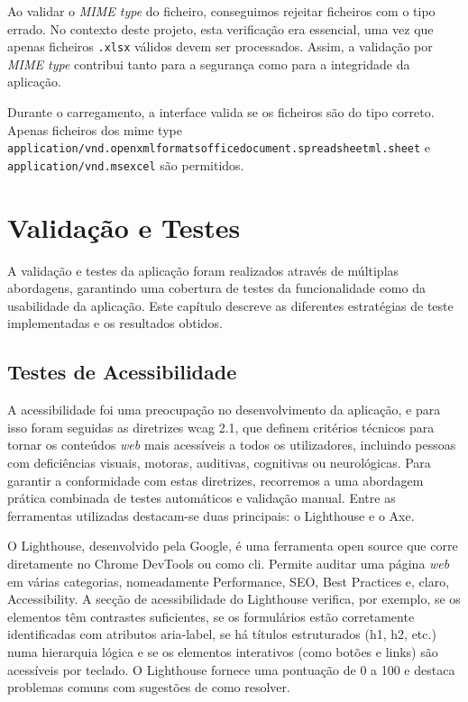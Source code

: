 Ao validar o \textit{MIME type} do ficheiro, conseguimos rejeitar ficheiros com o tipo errado. No contexto deste projeto, esta verificação era essencial, uma vez que apenas ficheiros \texttt{.xlsx} válidos devem ser processados. Assim, a validação por \textit{MIME type} contribui tanto para a segurança como para a integridade da aplicação.

Durante o carregamento, a interface valida se os ficheiros são do tipo correto. Apenas ficheiros dos mime type \texttt{application/vnd\allowbreak.openxmlformats\allowbreak officedocument\allowbreak.spreadsheetml\allowbreak.sheet} e \texttt{application/vnd.ms\allowbreak excel} são permitidos.

\chapter{Validação e Testes}
\label{ch:validacaoTestes}

A validação e testes da aplicação foram realizados através de múltiplas abordagens, garantindo uma cobertura de testes  da funcionalidade como da usabilidade da aplicação. Este capítulo descreve as diferentes estratégias de teste implementadas e os resultados obtidos.

\section{Testes de Acessibilidade}

A acessibilidade foi uma preocupação no desenvolvimento da aplicação, e para isso foram seguidas as diretrizes \gls{wcag} 2.1, que definem critérios técnicos para tornar os conteúdos \textit{web} mais acessíveis a todos os utilizadores, incluindo pessoas com deficiências visuais, motoras, auditivas, cognitivas ou neurológicas. Para garantir a conformidade com estas diretrizes, recorremos a uma abordagem prática combinada de testes automáticos e validação manual. Entre as ferramentas utilizadas destacam-se duas principais: o Lighthouse e o Axe.

O Lighthouse, desenvolvido pela Google, é uma ferramenta open source que corre diretamente no Chrome DevTools ou como \gls{cli}. Permite auditar uma página \textit{web} em várias categorias, nomeadamente Performance, SEO, Best Practices e, claro, Accessibility. A secção de acessibilidade do Lighthouse verifica, por exemplo, se os elementos têm contrastes suficientes, se os formulários estão corretamente identificadas com atributos aria-label, se há títulos estruturados (h1, h2, etc.) numa hierarquia lógica e se os elementos interativos (como botões e links) são acessíveis por teclado. O Lighthouse fornece uma pontuação de 0 a 100 e destaca problemas comuns com sugestões de como resolver.

